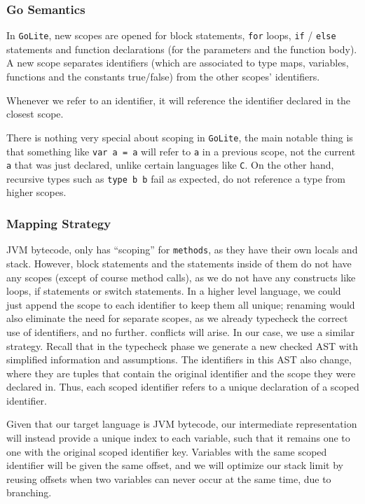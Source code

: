 \documentclass[11pt]{article}
\begin{document}
\subsubsection{Go Semantics}
\label{sec:orgf8cf82b}
In \texttt{GoLite}, new scopes are opened for block statements, \texttt{for}
loops, \texttt{if} / \texttt{else} statements and function declarations (for the
parameters and the function body). A new scope separates
identifiers (which are associated to type maps, variables,
functions and the constants true/false) from the other scopes'
identifiers.

Whenever we refer to an identifier, it will reference the
identifier declared in the closest scope.

There is nothing very special about scoping in \texttt{GoLite}, the main
notable thing is that something like \texttt{var a = a} will refer to \texttt{a}
in a previous scope, not the current \texttt{a} that was just declared,
unlike certain languages like \texttt{C}.
On the other hand, recursive types such as \texttt{type b b} fail as expected,
do not reference a type from higher scopes.
\subsubsection{Mapping Strategy}
\label{sec:orge137b79}
JVM bytecode, only has ``scoping'' for \texttt{methods}, as they have
their own locals and stack. However, block statements and the
statements inside of them do not have any scopes (except of course
method calls), as we do not have any constructs like loops, if
statements or switch statements. In a higher level language, we
could just append the scope to each identifier to keep them all
unique; renaming would also eliminate the need for separate scopes,
as we already typecheck the correct use of identifiers, and no further.
conflicts will arise. In our case, we use a similar strategy. Recall that
in the typecheck phase we generate a new checked AST with
simplified information and assumptions. The identifiers in this
AST also change, where they are tuples that contain the original
identifier and the scope they were declared in. Thus, each scoped
identifier refers to a unique declaration of a scoped identifier.

Given that our target language is JVM bytecode, our intermediate
representation will instead provide a unique index to each variable,
such that it remains one to one with the original scoped identifier key.
Variables with the same scoped identifier will be given the same offset,
and we will optimize our stack limit by reusing offsets when two variables
can never occur at the same time, due to branching.
\end{document}
